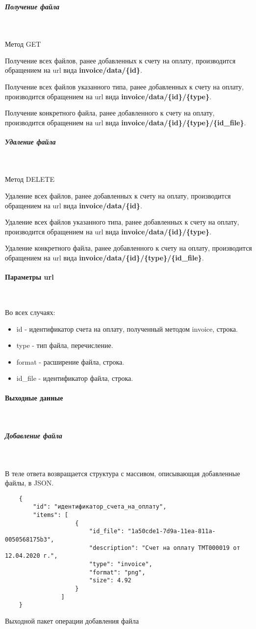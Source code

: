 \documentclass[11pt, a4paper]{article}
\begin{document}
\subparagraph{Получение файла}\

Метод GET

Получение всех файлов, ранее добавленных к счету на оплату, производится обращением на url вида \textbf{invoice/data/\{id\}}.

Получение всех файлов указанного типа, ранее добавленных к счету на оплату, производится обращением на url вида \textbf{invoice/data/\{id\}/\{type\}}.

Получение конкретного файла, ранее добавленного к счету на оплату, производится обращением на url вида \textbf{invoice/data/\{id\}/\{type\}/\{id\_file\}}.

\subparagraph{Удаление файла}\

Метод DELETE

Удаление всех файлов, ранее добавленных к счету на оплату, производится обращением на url вида \textbf{invoice/data/\{id\}}.

Удаление всех файлов указанного типа, ранее добавленных к счету на оплату, производится обращением на url вида \textbf{invoice/data/\{id\}/\{type\}}.

Удаление конкретного файла, ранее добавленного к счету на оплату, производится обращением на url вида \textbf{invoice/data/\{id\}/\{type\}/\{id\_file\}}.

\paragraph{Параметры url}\

Во всех случаях:
\begin{itemize}
	\item id - идентификатор счета на оплату, полученный методом invoice, строка.
	\item type - тип файла, перечисление.
	\item format - расширение файла, строка.
	\item id\_file - идентификатор файла, строка.
\end{itemize}

\paragraph{Выходные данные}\

\subparagraph{Добавление файла}\

В теле ответа возвращается структура с массивом, описывающая добавленные файлы, в JSON.

\begin{listing}[H]
	\begin{verbatim}
	{
		"id": "идентификатор_счета_на_оплату",
		"items": [
					{
						"id_file": "1a50cde1-7d9a-11ea-811a-0050568175b3",
						"description": "Счет на оплату ТМТ000019 от 12.04.2020 г.",
						"type": "invoice",
						"format": "png",
						"size": 4.92
					}
				]
	}
	\end{verbatim}
	\caption{Выходной пакет операции добавления файла}
\end{listing}
\end{document}
